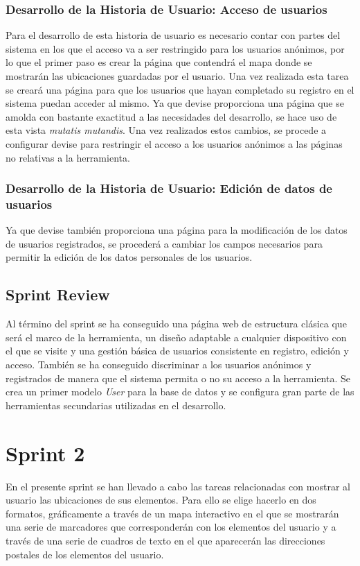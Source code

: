 	\subsubsection{Desarrollo de la Historia de Usuario: Acceso de usuarios }
	Para el desarrollo de esta historia de usuario es necesario contar con partes del sistema en los que el acceso va a ser restringido para los usuarios anónimos, por lo que el primer paso es crear la página que contendrá el mapa donde se mostrarán las ubicaciones guardadas por el usuario.
	Una vez realizada esta tarea se creará una página para que los usuarios que hayan completado su registro en el sistema puedan acceder al mismo. Ya que devise proporciona una página que se amolda con bastante exactitud a las necesidades del desarrollo, se hace uso de esta vista \textit{mutatis mutandis}.
	Una vez realizados estos cambios, se procede a configurar devise para restringir el acceso a los usuarios anónimos a las páginas no relativas a la herramienta.
	
	\subsubsection{Desarrollo de la Historia de Usuario: Edición de datos de usuarios }
	Ya que devise también proporciona una página para la modificación de los datos de usuarios registrados, se procederá a cambiar los campos necesarios para permitir la edición de los datos personales de los usuarios.
	
	\subsection{Sprint Review}
	Al término del sprint se ha conseguido una página web de estructura clásica que será el marco de la herramienta, un diseño adaptable a cualquier dispositivo con el que se visite y una gestión básica de usuarios consistente en registro, edición y acceso. También se ha conseguido discriminar a los usuarios anónimos y registrados de manera que el sistema permita o no su acceso a la herramienta. Se crea un primer modelo \textit{User} para la base de datos y se configura gran parte de las herramientas secundarias utilizadas en el desarrollo.

\section{Sprint 2}
En el presente sprint se han llevado a cabo las tareas relacionadas con mostrar al usuario las ubicaciones de sus elementos. Para ello se elige hacerlo en dos formatos, gráficamente a través de un mapa interactivo en el que se mostrarán una serie de marcadores que corresponderán con los elementos del usuario y a través de una serie de cuadros de texto en el que aparecerán las direcciones postales de los elementos del usuario.

